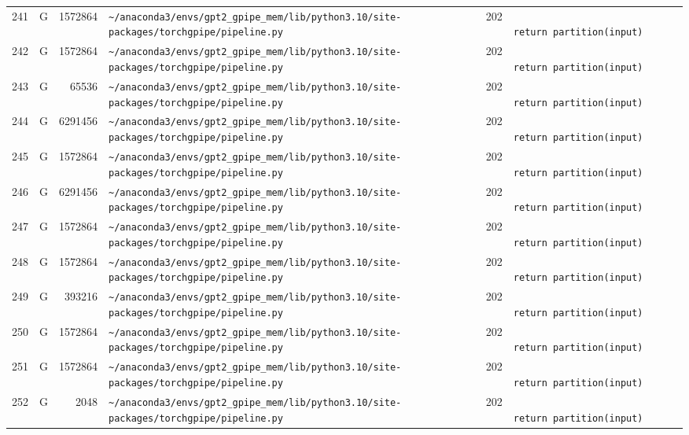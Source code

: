 \documentclass{article}
\begin{document}
\begin{longtable}{r l r p{6.5cm} r p{7.0cm}}
241 & G & 1572864 & \lstinline|~/anaconda3/envs/gpt2_gpipe_mem/lib/python3.10/site-packages/torchgpipe/pipeline.py| & 202 & \lstinline|                        return partition(input)| \\
242 & G & 1572864 & \lstinline|~/anaconda3/envs/gpt2_gpipe_mem/lib/python3.10/site-packages/torchgpipe/pipeline.py| & 202 & \lstinline|                        return partition(input)| \\
243 & G & 65536 & \lstinline|~/anaconda3/envs/gpt2_gpipe_mem/lib/python3.10/site-packages/torchgpipe/pipeline.py| & 202 & \lstinline|                        return partition(input)| \\
244 & G & 6291456 & \lstinline|~/anaconda3/envs/gpt2_gpipe_mem/lib/python3.10/site-packages/torchgpipe/pipeline.py| & 202 & \lstinline|                        return partition(input)| \\
245 & G & 1572864 & \lstinline|~/anaconda3/envs/gpt2_gpipe_mem/lib/python3.10/site-packages/torchgpipe/pipeline.py| & 202 & \lstinline|                        return partition(input)| \\
246 & G & 6291456 & \lstinline|~/anaconda3/envs/gpt2_gpipe_mem/lib/python3.10/site-packages/torchgpipe/pipeline.py| & 202 & \lstinline|                        return partition(input)| \\
247 & G & 1572864 & \lstinline|~/anaconda3/envs/gpt2_gpipe_mem/lib/python3.10/site-packages/torchgpipe/pipeline.py| & 202 & \lstinline|                        return partition(input)| \\
248 & G & 1572864 & \lstinline|~/anaconda3/envs/gpt2_gpipe_mem/lib/python3.10/site-packages/torchgpipe/pipeline.py| & 202 & \lstinline|                        return partition(input)| \\
249 & G & 393216 & \lstinline|~/anaconda3/envs/gpt2_gpipe_mem/lib/python3.10/site-packages/torchgpipe/pipeline.py| & 202 & \lstinline|                        return partition(input)| \\
250 & G & 1572864 & \lstinline|~/anaconda3/envs/gpt2_gpipe_mem/lib/python3.10/site-packages/torchgpipe/pipeline.py| & 202 & \lstinline|                        return partition(input)| \\
251 & G & 1572864 & \lstinline|~/anaconda3/envs/gpt2_gpipe_mem/lib/python3.10/site-packages/torchgpipe/pipeline.py| & 202 & \lstinline|                        return partition(input)| \\
252 & G & 2048 & \lstinline|~/anaconda3/envs/gpt2_gpipe_mem/lib/python3.10/site-packages/torchgpipe/pipeline.py| & 202 & \lstinline|                        return partition(input)| \\

\end{longtable}
\end{document}
